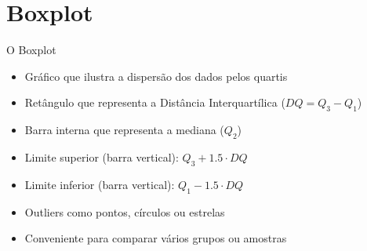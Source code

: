 \documentclass{beamer}
\begin{document}

\section{Boxplot}
\begin{frame}{O Boxplot}
  \begin{itemize}
  \item Gráfico que ilustra a dispersão dos dados pelos quartis
  \item Retângulo que representa a Distância Interquartílica ($DQ =
    Q_3-Q_1$)
  \item Barra interna que representa a mediana ($Q_2$)
  \item Limite superior (barra vertical): $Q_3 + 1.5 \cdot DQ$
  \item Limite inferior (barra vertical): $Q_1 - 1.5\cdot DQ$
  \item Outliers como pontos, círculos ou estrelas
  \item Conveniente para comparar vários grupos ou amostras
  \end{itemize}
\end{frame}
\end{document}
